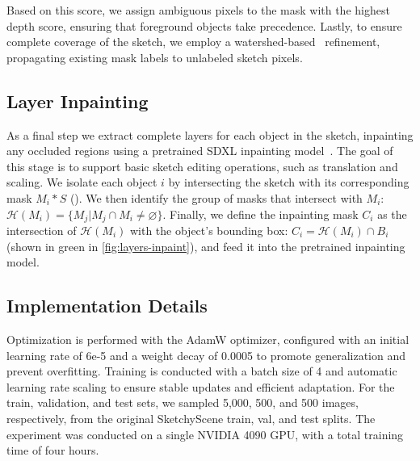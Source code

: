 \vspace{-2pt} 
Based on this score, we assign ambiguous pixels to the mask with the highest depth score, ensuring that foreground objects take precedence. 
Lastly, to ensure complete coverage of the sketch, we employ a watershed-based~\cite{watershed1991} refinement, propagating existing mask labels to  unlabeled sketch pixels.


\subsection{Layer Inpainting}
As a final step we extract complete layers for each object in the sketch, inpainting any occluded regions using  a pretrained SDXL inpainting model~\cite{von-platen-etal-2022-diffusers}. The goal of this stage is to support basic sketch editing operations, such as translation and scaling.
We isolate each object $i$ by intersecting the sketch with its corresponding mask $M_i * S$ (). 
We then identify the group of masks that intersect with $M_i$: $\mathcal{H}(M_i)=\{M_j | M_j \cap M_i \neq \varnothing \}$. Finally, we define the inpainting mask $C_i$ as the intersection of $\mathcal{H}(M_i)$ with the object's bounding box: $C_i = \mathcal{H}(M_i) \cap B_i$ (shown in green in \cref{fig:layers-inpaint}), and feed it into the pretrained inpainting model.

\subsection{Implementation Details}
Optimization is performed with the AdamW optimizer, configured with an initial learning rate of 6e-5 and a weight decay of 0.0005 to promote generalization and prevent overfitting. Training is conducted with a batch size of 4 and automatic learning rate scaling to ensure stable updates and efficient adaptation.
For the train, validation, and test sets, we sampled 5,000, 500, and 500 images, respectively, from the original SketchyScene train, val, and test splits. The experiment was conducted on a single NVIDIA 4090 GPU, with a total training time of four hours.

